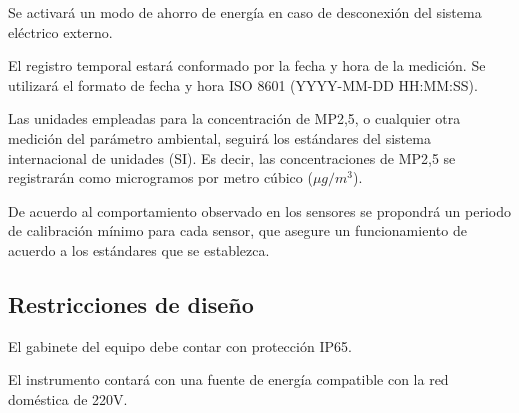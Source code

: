 \documentclass[
11pt, %
codirector, %
]{charter}
\makeatletter
\newcommand{\mytwodigits}[1]{\two@digits{#1}}
\newcounter{reqCounter}
\makeatother
\begin{document}
\begin{description}
	\item[\textbf{[\CODrequerimiento\mytwodigits{\value{reqCounter}}]}]
	 Se activará un modo de ahorro de energía en caso de desconexión del sistema eléctrico externo.
	
	\item[\textbf{[\CODrequerimiento\mytwodigits{\value{reqCounter}}]}]
	 El registro temporal estará conformado por la fecha y hora de la medición. Se utilizará el formato de fecha y hora ISO 8601 (YYYY-MM-DD HH:MM:SS).
	
	\item[\textbf{[\CODrequerimiento\mytwodigits{\value{reqCounter}}]}]
	 Las unidades empleadas para la concentración de MP2,5, o cualquier otra medición del parámetro ambiental, seguirá los estándares del sistema internacional de unidades (SI). Es decir, las concentraciones de MP2,5 se registrarán como microgramos por metro cúbico ($\mu g/m^3$).
	
	\item[\textbf{[\CODrequerimiento\mytwodigits{\value{reqCounter}}]}]
	 De acuerdo al comportamiento observado en los sensores se propondrá un periodo de calibración mínimo para cada sensor, que asegure un funcionamiento de acuerdo a los estándares que se establezca.
	


\end{description}

\subsection{Restricciones de diseño}
\label{sec:org49fe900}


\begin{description}
	
	\item[\textbf{[\CODrequerimiento\mytwodigits{\value{reqCounter}}]}]
	 El gabinete del equipo debe contar con protección IP65.
	
	\item[\textbf{[\CODrequerimiento\mytwodigits{\value{reqCounter}}]}]
	El instrumento contará con una fuente de energía compatible con la red doméstica de 220V.
	
\end{description}
\end{document}
